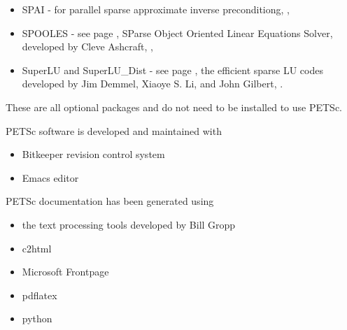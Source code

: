 \begin{itemize}
                     ,
  \item SPAI -        for parallel sparse approximate inverse preconditiong, 
                     ,
  \item SPOOLES - see page \pageref{sec_externalsol}, SParse Object Oriented Linear Equations Solver, developed by Cleve Ashcraft, 
                    ,
  \item SuperLU and SuperLU\_Dist - see page \pageref{sec_externalsol}, 
                    the efficient sparse LU codes developed by Jim Demmel,  Xiaoye S. Li, and John Gilbert, 
                    .
\end{itemize}
These are all optional packages and do not need to be installed to use PETSc.

PETSc software is developed and maintained with 
\begin{itemize}
\item Bitkeeper revision control system
\item Emacs editor
\end{itemize}

PETSc documentation has been generated using
\begin{itemize}
\item the text processing tools developed by Bill Gropp
\item c2html
\item Microsoft Frontpage
\item pdflatex
\item python
\end{itemize}


